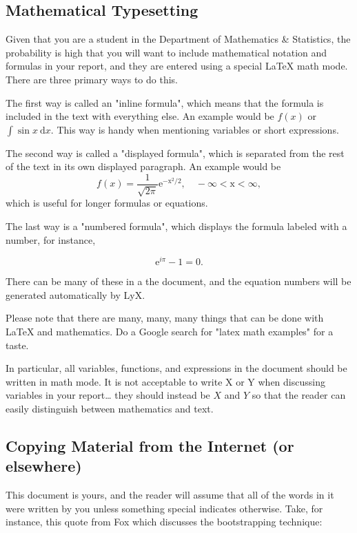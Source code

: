 \documentclass[11pt]{article}
\begin{document}
\subsection[Mathematical Typesetting]{Mathematical Typesetting}
\label{sec-3-1}

Given that you are a student in the Department of Mathematics \&
Statistics, the probability is high that you will want to include
mathematical notation and formulas in your report, and they are
entered using a special \LaTeX{} math mode. There are three primary ways
to do this.

The first way is called an "inline formula", which means that the
formula is included in the text with everything else. An example would
be \(f(x)\) or \( \int\sin x\ \mathrm{d}x \). This way is handy when
mentioning variables or short expressions.

The second way is called a "displayed formula", which is separated
from the rest of the text in its own displayed paragraph. An example
would be
\[
f(x)=\frac{1}{\sqrt{2\pi}}\mathrm{e^{-x^{2}/2},\quad-\infty<x<\infty},
\]
which is useful for longer formulas or equations. 

The last way is a "numbered formula", which displays the formula
labeled with a number, for instance,

\begin{equation}
\mathrm{e}^{i\pi}-1=0.
\end{equation}

There can be many of these in a the document, and the equation numbers
will be generated automatically by LyX.

Please note that there are many, many, many things that can be done
with \LaTeX{} and mathematics. Do a Google search for "latex math
examples" for a taste.

In particular, all variables, functions, and expressions in the
document should be written in math mode. It is not acceptable to write
X or Y when discussing variables in your report\ldots{} they should instead
be \(X\) and \(Y\) so that the reader can easily distinguish between
mathematics and text.
\subsection[Copying Material from the Internet (or elsewhere)]{Copying Material from the Internet (or elsewhere)}
\label{sec-3-2}

This document is yours, and the reader will assume that all of the
words in it were written by you unless something special indicates
otherwise. Take, for instance, this quote from Fox \cite{Fox2002}
which discusses the bootstrapping technique:
\end{document}
